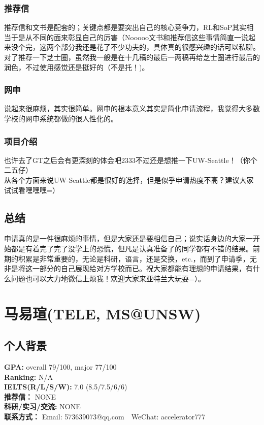 \documentclass[a4paper,UTF8]{book}
\begin{document}
        \subsubsection*{推荐信}
        推荐信和文书是配套的；关键点都是要突出自己的核心竞争力，RL和SoP其实相当于是从不同的面来彰显自己的厉害（Nooooo文书和推荐信这些事情简直一说起来没个完，这两个部分我还是花了不少功夫的，具体真的很感兴趣的话可以私聊。\\
        对了推荐一下芝士圈，虽然我一般是在十几稿的最后一两稿再给芝士圈进行最后的润色，不过使用感觉还是挺好的（不是托！)。

        \subsubsection*{网申}
        说起来很麻烦，其实很简单。网申的根本意义其实是简化申请流程，我觉得大多数学校的网申系统都做的很人性化的。

        \subsubsection*{项目介绍}
        也许去了GT之后会有更深刻的体会吧2333不过还是想推一下UW-Seattle！（你个二五仔）\\
        从各个方面来说UW-Seattle都是很好的选择，但是似乎申请热度不高？建议大家试试看嘿嘿嘿=） 

    \subsection*{总结}
    申请真的是一件很麻烦的事情，但是大家还是要相信自己；说实话身边的大家一开始都是有着完了完了没学上的恐慌，但凡是认真准备了的同学都有不错的结果。前期的积累是非常重要的，无论是科研，语言，还是交换，etc.，而到了申请季，无非是将这一部分的自己展现给对方学校而已。祝大家都能有理想的申请结果，有什么问题也可以大力地微信上烦我！欢迎大家来亚特兰大玩耍=）。

\clearpage
\section{马易瑄(TELE, MS@UNSW)}
    \subsection*{个人背景}
        \textbf{GPA:} overall 79/100, major 77/100\\
        \textbf{Ranking:} N/A\\
        \textbf{IELTS(R/L/S/W): }7.0 (8.5/7.5/6/6)\\
        \textbf{推荐信：} NONE\\
        \textbf{科研/实习/交流:} NONE\\ 
        \textbf{联系方式：} Email: 573639073@qq.com$\quad$WeChat: accelerator777
\end{document}
